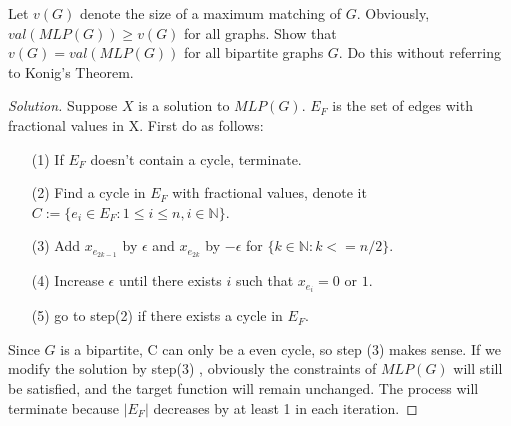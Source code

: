 


    \begin{thm}{}{}
        Let $v(G)$ denote the size of a maximum matching of $G$.
        Obviously, $val(MLP(G))\ge v(G)$ for all graphs.
        Show that $v(G)=val(MLP(G))$ for all bipartite graphs $G$.
        Do this without referring to Konig's Theorem.
    \end{thm}
    \begin{proof}[Solution]
        Suppose $X$ is a solution to $MLP(G)$.
        $E_F$ is the set of edges with fractional values in X.
        First do as follows:
        \begin{itemize}
            \item[(1)] If $E_F$ doesn't contain a cycle, terminate.
            \item[(2)] Find a cycle in $E_F$ with fractional values, denote it $C:=\{e_i\in E_F :1\le i \le n,i\in\mathbb{N}\}$.
            \item[(3)] Add $x_{e_{2k-1}}$ by $\epsilon$ and $x_{e_{2k}}$ by $-\epsilon$ for $\{k\in \mathbb{N}:k<=n/2\}$.
            \item[(4)] Increase $\epsilon$ until there exists $i$ such that $x_{e_i}=0 \text{ or } 1$.
            \item[(5)] go to step(2) if there exists a cycle in $E_F$.
        \end{itemize}
        Since $G$ is a bipartite, C can only be a even cycle, so step (3) makes sense.
        If we modify the solution by step(3) , obviously the constraints of $MLP(G)$ will still be satisfied, and the target function will remain unchanged.
        The process will terminate because $|E_F|$ decreases by at least 1 in each iteration.


\end{proof}
